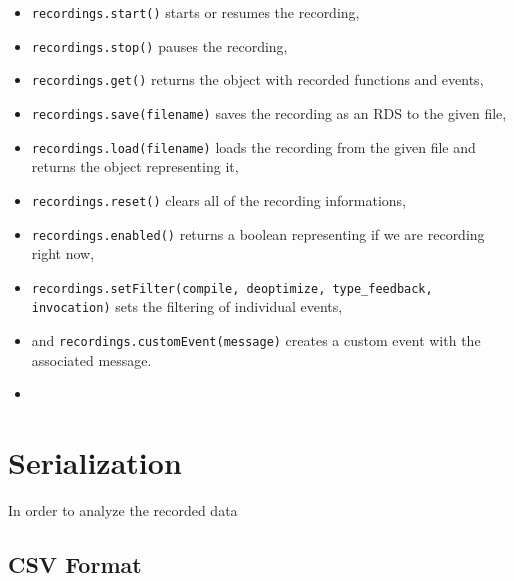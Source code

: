 \begin{itemize}
	\item \texttt{recordings.start()} starts or resumes the recording,
	\item \texttt{recordings.stop()} pauses the recording,
	\item \texttt{recordings.get()} returns the object with recorded functions and events,

	\item \texttt{recordings.save(filename)} saves the recording as an RDS to the given file,
	\item \texttt{recordings.load(filename)} loads the recording from the given file and returns the object representing it,

	\item \texttt{recordings.reset()} clears all of the recording informations,
	\item \texttt{recordings.enabled()} returns a boolean representing if we are recording right now,

	\item \texttt{recordings.setFilter(compile, deoptimize, type\_feedback, invocation)} sets the filtering of individual events,

	\item and \texttt{recordings.customEvent(message)} creates a custom event with the associated message.
	\item {}
\end{itemize}

\section{Serialization}

In order to analyze the recorded data

\subsection{CSV Format}
